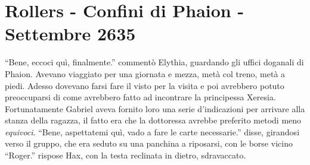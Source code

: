   \section{Rollers - Confini di Phaion - Settembre 2635}

    ``Bene, eccoci quì, finalmente.'' commentò Elythia, guardando gli
    uffici doganali di Phaion. Avevano viaggiato per una giornata e mezza,
    metà col treno, metà a piedi. Adesso dovevano farsi fare il visto per
    la visita e poi avrebbero potuto preoccuparsi di come avrebbero fatto
    ad incontrare la principessa Xeresia. Fortunatamente Gabriel aveva
    fornito loro una serie d'indicazioni per arrivare alla stanza della
    ragazza, il fatto era che la dottoressa avrebbe preferito metodi meno
    \emph{equivoci}. ``Bene, aspettatemi quì, vado a fare le carte
    necessarie.'' disse, girandosi verso il gruppo, che era seduto su una
    panchina a riposarsi, con le borse vicino ``Roger.'' rispose Hax, con
    la testa reclinata in dietro, sdravaccato.

